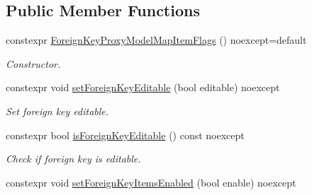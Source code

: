 \subsection*{Public Member Functions}
\begin{DoxyCompactItemize}
\item 
constexpr \hyperlink{class_mdt_1_1_item_model_1_1_foreign_key_proxy_model_map_item_flags_ac8372363a658f70ac9e94f2e33a60c45}{Foreign\+Key\+Proxy\+Model\+Map\+Item\+Flags} () noexcept=default\hypertarget{class_mdt_1_1_item_model_1_1_foreign_key_proxy_model_map_item_flags_ac8372363a658f70ac9e94f2e33a60c45}{}\label{class_mdt_1_1_item_model_1_1_foreign_key_proxy_model_map_item_flags_ac8372363a658f70ac9e94f2e33a60c45}

\begin{DoxyCompactList}\small\item\em Constructor. \end{DoxyCompactList}\item 
constexpr void \hyperlink{class_mdt_1_1_item_model_1_1_foreign_key_proxy_model_map_item_flags_a756bd60a38291f27f20c58352fd87660}{set\+Foreign\+Key\+Editable} (bool editable) noexcept\hypertarget{class_mdt_1_1_item_model_1_1_foreign_key_proxy_model_map_item_flags_a756bd60a38291f27f20c58352fd87660}{}\label{class_mdt_1_1_item_model_1_1_foreign_key_proxy_model_map_item_flags_a756bd60a38291f27f20c58352fd87660}

\begin{DoxyCompactList}\small\item\em Set foreign key editable. \end{DoxyCompactList}\item 
constexpr bool \hyperlink{class_mdt_1_1_item_model_1_1_foreign_key_proxy_model_map_item_flags_aa25125ac186f1c0a2ed6485d19929067}{is\+Foreign\+Key\+Editable} () const noexcept\hypertarget{class_mdt_1_1_item_model_1_1_foreign_key_proxy_model_map_item_flags_aa25125ac186f1c0a2ed6485d19929067}{}\label{class_mdt_1_1_item_model_1_1_foreign_key_proxy_model_map_item_flags_aa25125ac186f1c0a2ed6485d19929067}

\begin{DoxyCompactList}\small\item\em Check if foreign key is editable. \end{DoxyCompactList}\item 
constexpr void \hyperlink{class_mdt_1_1_item_model_1_1_foreign_key_proxy_model_map_item_flags_a4853b24c98c952c8faca6e964315f11a}{set\+Foreign\+Key\+Items\+Enabled} (bool enable) noexcept\hypertarget{class_mdt_1_1_item_model_1_1_foreign_key_proxy_model_map_item_flags_a4853b24c98c952c8faca6e964315f11a}{}\label{class_mdt_1_1_item_model_1_1_foreign_key_proxy_model_map_item_flags_a4853b24c98c952c8faca6e964315f11a}


\end{DoxyCompactItemize}
